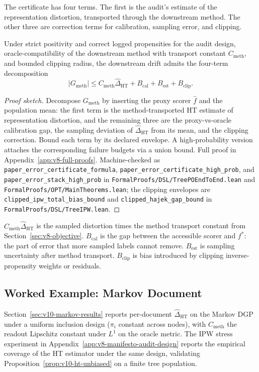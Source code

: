 The certificate has four terms. The first is the audit's estimate of
the representation distortion, transported through the downstream
method. The other three are correction terms for calibration,
sampling error, and clipping.

\begin{proposition}
\label{prop:v10-finite-sample-certificate}
Under strict positivity and correct logged propensities for the
audit design, oracle-compatibility of the downstream method with
transport constant \(C_{\mathrm{meth}}\), and bounded clipping
radius, the downstream drift admits the four-term decomposition
\begin{equation}
\label{eq:v8-finite-sample-certificate}
  |G_{\mathrm{meth}}|
  \le
  C_{\mathrm{meth}}\widehat{\Delta}_{\mathrm{HT}}
  +
  B_{\mathrm{cal}}
  +
  B_{\mathrm{est}}
  +
  B_{\mathrm{clip}} .
\end{equation}
\end{proposition}

\begin{proof}[Proof sketch]
Decompose \(G_{\mathrm{meth}}\) by inserting the proxy scorer
\(\widehat f\) and the population mean: the first term is the
method-transported HT estimate of representation distortion, and the
remaining three are the proxy-vs-oracle calibration gap, the
sampling deviation of \(\widehat\Delta_{\mathrm{HT}}\) from its
mean, and the clipping correction. Bound each term by its declared
envelope. A high-probability version attaches the corresponding
failure budgets via a union bound. Full proof in
Appendix~\ref{app:v8-full-proofs}. Machine-checked as
\texttt{paper\_error\_certificate\_formula},
\texttt{paper\_error\_certificate\_high\_prob}, and
\texttt{paper\_error\_stack\_high\_prob} in
\texttt{FormalProofs/DSL/TreePOEndToEnd.lean} and
\texttt{FormalProofs/OPT/MainTheorems.lean}; the clipping envelopes
are \texttt{clipped\_ipw\_total\_bias\_bound} and
\texttt{clipped\_hajek\_gap\_bound} in
\texttt{FormalProofs/DSL/TreeIPW.lean}.
\end{proof}

\(C_{\mathrm{meth}}\widehat{\Delta}_{\mathrm{HT}}\) is the sampled
distortion times the method transport constant from
Section~\ref{sec:v8-objective}. \(B_{\mathrm{cal}}\) is the gap
between the accessible scorer and \(f^\ast\): the part of error that
more sampled labels cannot remove. \(B_{\mathrm{est}}\) is sampling
uncertainty after method transport. \(B_{\mathrm{clip}}\) is bias
introduced by clipping inverse-propensity weights or residuals.

\subsection{Worked Example: Markov Document}

Section~\ref{sec:v10-markov-results} reports per-document
\(\widehat\Delta_{\mathrm{HT}}\) on the Markov DGP under a uniform
inclusion design (\(\pi_i\) constant across nodes), with
\(C_{\mathrm{meth}}\) the readout Lipschitz constant under
\(L^1\) on the oracle metric. The IPW stress experiment in
Appendix~\ref{app:v8-manifesto-audit-design} reports the empirical coverage
of the HT estimator under the same design, validating
Proposition~\ref{prop:v10-ht-unbiased} on a finite tree population.
